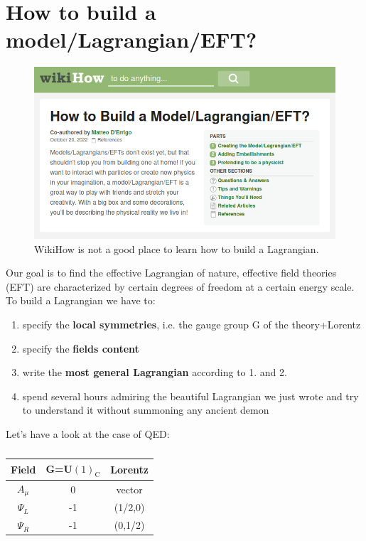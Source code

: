 \documentclass[../main.tex]{subfiles}
\begin{document}
\section{How to build a model/Lagrangian/EFT?}
\begin{figure}[h!]
\includegraphics{Images/WikiHow.png}
\caption{WikiHow is not a good place to learn how to build a Lagrangian.}
\end{figure}
Our goal is to find the effective Lagrangian of nature, effective field theories (EFT) are characterized by certain degrees of freedom at a certain energy scale. To build a Lagrangian we have to:
\begin{enumerate}
    \item specify the \textbf{local symmetries}, i.e. the gauge group G of the theory+Lorentz
    \item specify the \textbf{fields content}
    \item write the \textbf{most general Lagrangian} according to 1. and 2.
    \item spend several hours admiring the beautiful Lagrangian we just wrote and try to understand it without summoning any ancient demon
\end{enumerate}
Let's have a look at the case of QED:
\begin{table}[h]
    \centering
    \begin{tabular}{c|c|c}
        Field & G=U$(1)_{\text{C}}$ & Lorentz\\
        \hline
        $A_\mu$ & 0 & vector\\
        $\Psi_L$ & -1 & (1/2,0)\\
        $\Psi_R$ & -1 & (0,1/2)\\
        \hline
    \end{tabular}
    \caption*{}
\end{table}\\
\end{document}
